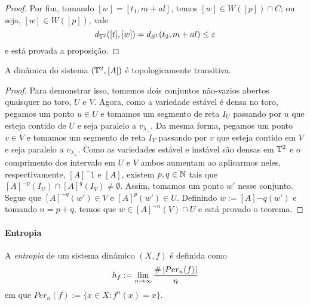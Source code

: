 \begin{proof}
Por fim, tomando $[w]=[t_1,m+al]$, temos $[w] \in W([p]) \cap C$; ou seja, $[w] \in W([p])$, vale
	\begin{equation*}
	d_{\mathbb{T}^2}([t],[w]) = d_{S^1}(t_2,m+al) \leq \varepsilon
	\end{equation*}
e está provada a proposição.
\end{proof}


\begin{theorem}
A dinâmica do sistema $(\mathbb{T}^2, [A])$ é topologicamente transitiva.
\end{theorem}
\begin{proof}
Para demonstrar isso, tomemos dois conjuntos não-vazios abertos quaisquer no toro, $U$ e $V$. Agora, como a variedade estável é densa no toro, pegamos um ponto $u \in U$ e tomamos um segmento de reta $I_U$ passando por $u$ que esteja contido de $U$ e seja paralelo a $v_{\lambda_-}$. Da mesma forma, pegamos um ponto $v \in V$ e tomamos um segmento de reta $I_V$ passando por $v$ que esteja contido em $V$ e seja paralelo a $v_{\lambda_+}$. Como as variedades estável e instável são densas em $\mathbb{T}^2$ e o comprimento dos intervalo em $U$ e $V$ ambos aumentam ao aplicarmos neles, respectivamente, $[A]^-1$ e $[A]$, existem $p,q \in \mathbb{N}$ tais que $[A]^{-p}(I_U) \cap [A]^q(I_V) \neq \emptyset$. Assim, tomamos um ponto $w'$ nesse conjunto. Segue que $[A]^{-q}(w') \in V$ e $[A]^p(w') \in U$. Definindo $w := [A]{-q}(w')$ e tomando $n=p+q$, temos que $w \in [A]^{-n}(V) \cap U$ e está provado o teorema.
\end{proof}


\paragraph{Entropia}

\begin{definition}
A \textit{entropia} de um sistema dinâmico $(X,f)$ é definida como
	\begin{equation*}
	h_f := \lim_{n \to \infty} \frac{\#\left\lvert{Per_n(f)}\right\rvert}{n}
	\end{equation*}
em que $Per_n(f) := \{x \in X : f^n(x)=x\}$.
\end{definition}

